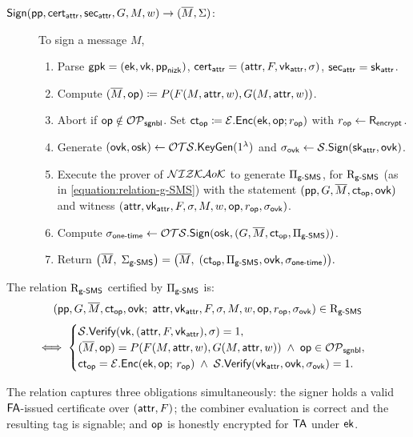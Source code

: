 \begin{description}
\item[$\SMSSign(\pp, \certattr, \secattr, G, M, w) \to (\tM, \Sigma)$:]
To sign a message $M$,
\
\begin{enumerate}
\item 
Parse $\gpk = (\ek, \vk, \ppnizk)$,
$\certattr = (\attr, F, \vkattr, \sigma)$, $\secattr = \skattr$.
\item 
Compute $(\tM, \op) \coloneqq P(F(M, \attr, w), G(M, \attr, w))$.
\item 
Abort if $\op \notin \OpeningSetSignable$.
Set $\ctop \coloneqq \EEnc(\ek, \op; \rop)$ with $\rop \gets \RandomnessEncrypt$.
\item 
Generate $(\ovk, \osk) \gets \OTSKeyGen(1^\lambda)$
and $\sigmaovk \gets \SSign(\skattr, \ovk)$.
\item 
Execute the prover of $\NIZKAoK$ to generate $\PiGenericSMS$, for $\RelationGenericSMS$
(as in \eqref{equation:relation-g-SMS})
with the statement $(\pp, G, \tM, \ctop, \ovk)$
and witness $(\attr, \vkattr, F, \allowbreak \sigma, M, w, \op, \rop, \sigmaovk)$.
\item 
Compute $\sigmaonetime \gets \OTSSign(\osk, (G, \tM, \ctop, \PiGenericSMS))$.
\item 
Return
$
\bigl(\tM,\; \SigmaGenericSMS\bigr)
= \bigl(\tM,\; (\ctop, \PiGenericSMS, \ovk, \sigmaonetime)\bigr).
$
\end{enumerate}

\end{description}

The relation $\RelationGenericSMS$ certified by $\PiGenericSMS$ is:
\begin{equation}\label{equation:relation-g-SMS}
(\pp, G, \tM, \ctop, \ovk;\;
\attr, \vkattr, F, \sigma, M, w, \op, \rop, \sigmaovk)
\in \RelationGenericSMS
\end{equation}
\[
\iff
\begin{cases}
\SVerify(\vk, (\attr, F, \vkattr), \sigma) = 1,
\\
(\tM, \op) = P(F(M, \attr, w), G(M, \attr, w))
\;\land\; \op \in \OpeningSetSignable,
\\
\ctop = \EEnc(\ek, \op;\, \rop)
\;\land\; \SVerify(\vkattr, \ovk, \sigmaovk) = 1.
\end{cases}
\]

The relation captures three obligations simultaneously:
the signer holds a valid $\FA$-issued certificate over $(\attr, F)$;
the combiner evaluation is correct and the resulting tag is signable;
and $\op$ is honestly encrypted for $\TA$ under $\ek$.

